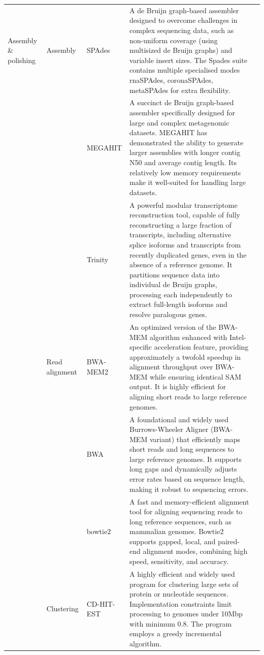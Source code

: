 \begin{longtable}{p{2cm}p{1.8cm}p{1.8cm}p{8.3cm}p{1cm}}
Assembly \& polishing & Assembly & SPAdes & A de Bruijn graph-based assembler designed to overcome challenges in complex sequencing data, such as non-uniform coverage (using multisized de Bruijn graphs) and variable insert sizes. The Spades suite contains multiple specialised modes rnaSPAdes, coronaSPAdes, metaSPAdes for extra flexibility. & \citep{Meleshko2021-gb} \\
\cmidrule{3-5}
 &  & MEGAHIT & A succinct de Bruijn graph-based assembler specifically designed for large and complex metagenomic datasets. MEGAHIT has demonstrated the ability to generate larger assemblies with longer contig N50 and average contig length. Its relatively low memory requirements make it well-suited for handling large datasets. & \citep{Li2016-sd} \\
\cmidrule{3-5}
 &  & Trinity & A powerful modular transcriptome reconstruction tool, capable of fully reconstructing a large fraction of transcripts, including alternative splice isoforms and transcripts from recently duplicated genes, even in the absence of a reference genome. It partitions sequence data into individual de Bruijn graphs, processing each independently to extract full-length isoforms and resolve paralogous genes. & \citep{Grabherr2011-ef} \\
\cmidrule{2-5}
 & Read alignment & BWA-MEM2 & An optimized version of the BWA-MEM algorithm enhanced with Intel-specific acceleration feature, providing approximately a twofold speedup in alignment throughput over BWA-MEM while ensuring identical SAM output. It is highly efficient for aligning short reads to large reference genomes. & \citep{Vasimuddin2019-rb} \\
\cmidrule{3-5}
 &  & BWA & A foundational and widely used Burrows-Wheeler Aligner (BWA-MEM variant) that efficiently maps short reads and long sequences to large reference genomes. It supports long gaps and dynamically adjusts error rates based on sequence length, making it robust to sequencing errors. & \citep{Li2013-pp} \\
\cmidrule{3-5}
 &  & bowtie2 & A fast and memory-efficient alignment tool for aligning sequencing reads to long reference sequences, such as mammalian genomes. Bowtie2 supports gapped, local, and paired-end alignment modes, combining high speed, sensitivity, and accuracy. & \citep{Langmead2019-wx} \\
\cmidrule{2-5}
 & Clustering & CD-HIT-EST & A highly efficient and widely used program for clustering large sets of protein or nucleotide sequences. Implementation constraints limit processing to genomes under 10Mbp with minimum 0.8. The program employs a greedy incremental algorithm. & \citep{Li2006-nj} \\

\end{longtable}
